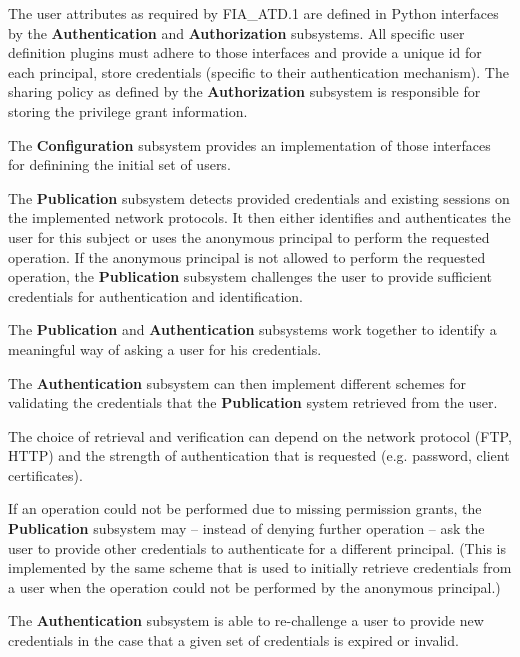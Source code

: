 \documentclass[12pt,english]{scrbook}
\begin{document}

The user attributes as required by FIA\_ATD.1 are defined in Python interfaces
by the \textbf{Authentication} and \textbf{Authorization} subsystems. All
specific user definition plugins must adhere to those interfaces and provide a
unique id for each principal, store credentials (specific to their
authentication mechanism). The sharing policy as defined by the
\textbf{Authorization} subsystem is responsible for storing the privilege
grant information.

The \textbf{Configuration} subsystem provides an implementation of those
interfaces for definining the initial set of users.


The \textbf{Publication} subsystem detects provided credentials and existing
sessions on the implemented network protocols. It then either identifies and
authenticates the user for this subject or uses the anonymous principal to
perform the requested operation. If the anonymous principal is not allowed to
perform the requested operation, the \textbf{Publication} subsystem challenges
the user to provide sufficient credentials for authentication and
identification.

The \textbf{Publication} and \textbf{Authentication} subsystems work together
to identify a meaningful way of asking a user for his credentials. 

The \textbf{Authentication} subsystem can then implement different schemes for
validating the credentials that the \textbf{Publication} system retrieved from
the user.

The choice of retrieval and verification can depend on the network protocol
(FTP, HTTP) and the strength of authentication that is requested (e.g. password,
client certificates).


If an operation could not be performed due to missing permission grants, the
\textbf{Publication} subsystem may -- instead of denying further operation --
ask the user to provide other credentials to authenticate for a different
principal. (This is implemented by the same scheme that is used to initially
retrieve credentials from a user when the operation could not be performed by
the anonymous principal.)

The \textbf{Authentication} subsystem is able to re-challenge a user to
provide new credentials in the case that a given set of credentials is expired
or invalid.
\end{document}
